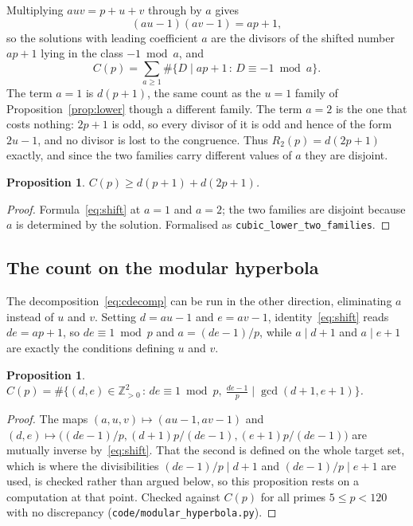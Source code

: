 \documentclass[11pt]{article}
\theoremstyle{plain}
\newtheorem{proposition}[theorem]{Proposition}
\theoremstyle{definition}
\newcommand{\Z}{\mathbb{Z}}
\begin{document}
Multiplying $auv=p+u+v$ through by $a$ gives
\begin{equation}\label{eq:shift}
  (au-1)(av-1)=ap+1,
\end{equation}
so the solutions with leading coefficient $a$ are the divisors of the shifted number
$ap+1$ lying in the class $-1 \bmod a$, and
\begin{equation}\label{eq:cdecomp}
  C(p)=\sum_{a\ge1}\#\{D\mid ap+1 \,:\, D\equiv-1 \bmod a\}.
\end{equation}
The term $a=1$ is $d(p+1)$, the same count as the $u=1$ family of Proposition~\ref{prop:lower}
though a different family. The term $a=2$ is the
one that costs nothing: $2p+1$ is odd, so every divisor of it is odd and hence of the form
$2u-1$, and no divisor is lost to the congruence. Thus $R_2(p)=d(2p+1)$ exactly, and since
the two families carry different values of $a$ they are disjoint.

\begin{proposition}\label{prop:twofam}
$C(p)\ge d(p+1)+d(2p+1)$.
\end{proposition}

\begin{proof}
Formula~\eqref{eq:shift} at $a=1$ and $a=2$; the two families are disjoint because $a$ is
determined by the solution. Formalised as \texttt{cubic\_lower\_two\_families}.
\end{proof}

\subsection{The count on the modular hyperbola}

The decomposition~\eqref{eq:cdecomp} can be run in the other direction, eliminating $a$
instead of $u$ and $v$. Setting $d=au-1$ and $e=av-1$, identity~\eqref{eq:shift} reads
$de=ap+1$, so $de\equiv1\bmod p$ and $a=(de-1)/p$, while $a\mid d+1$ and $a\mid e+1$ are
exactly the conditions defining $u$ and $v$.

\begin{proposition}\label{prop:modhyp}
$C(p)=\#\bigl\{(d,e)\in\Z_{>0}^2 \,:\, de\equiv1 \bmod p,\ \tfrac{de-1}{p}\mid\gcd(d+1,e+1)\bigr\}$.
\end{proposition}

\begin{proof}
The maps $(a,u,v)\mapsto(au-1,av-1)$ and $(d,e)\mapsto\bigl((de-1)/p,(d+1)p/(de-1),
(e+1)p/(de-1)\bigr)$ are mutually inverse by~\eqref{eq:shift}. That the second is defined on
the whole target set, which is where the divisibilities $(de-1)/p\mid d+1$ and
$(de-1)/p\mid e+1$ are used, is checked rather than argued below, so this proposition rests
on a computation at that point.
Checked against $C(p)$ for all primes $5\le p<120$ with no discrepancy
(\texttt{code/modular\_hyperbola.py}).
\end{proof}
\end{document}
